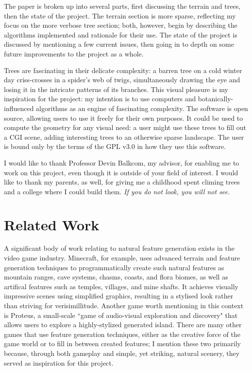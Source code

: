 \documentclass{article}
\newcommand{\tab}{\hspace*{2em}}
\begin{document}
    \tab The paper is broken up into several parts, first discussing the terrain and trees, then
the state of the project. The terrain section is more sparse, reflecting my focus on the more
verbose tree section; both, however, begin by describing the algorithms implemented and rationale
for their use. The state of the project is discussed by mentioning a few current issues, then going
in to depth on some future improvements to the project as a whole.

    \tab Trees are fascinating in their delicate complexity: a barren tree on a cold winter
day criss-crosses in a spider's web of twigs, simultaneously drawing the eye and losing it in the
intricate patterns of its branches. This visual pleasure is my inspiration for the project: my
intention is to use computers and botanically-influenced algorithms as an engine of fascinating
complexity. The software is open source, allowing users to use it freely for their own purposes. It
could be used to compute the geometry for any visual need: a user might use these trees to fill out
a CGI scene, adding interesting trees to an otherwise sparse landscape. The user is bound only by
the terms of the GPL v3.0 in how they use this software.

    \tab I would like to thank Professor Devin Balkcom, my advisor, for enabling me to work on this
project, even though it is outside of your field of interest. I would like to thank my parents, as
well, for giving me a childhood spent climing trees and a college where I could build them.
\emph{If you do not look, you will not see.}

    \section{Related Work}
    \tab A significant body of work relating to natural feature generation exists in the video game
industry. Minecraft\cite{minecraft}, for example, uses advanced terrain and feature generation
techniques to programmatically create such natural features as mountain ranges, cave systems, chasms,
coasts, and flora biomes, as well as artifical features such as temples, villages, and mine shafts.
It achieves visually impressive scenes using simplified graphics, resulting in a stylised look rather
than striving for verisimillitude. Another game worth mentioning in this context is
Proteus\cite{proteus}, a small-scale ``game of audio-visual exploration and discovery" that allows
users to explore a highly-stylized generated island. There are many other games that use feature
generation techniques, either as the creative force of the game world or to fill in between created
features; I mention these two primarily because, through both gameplay and simple, yet striking,
natural scenery, they served as inspiration for this project.
\end{document}
